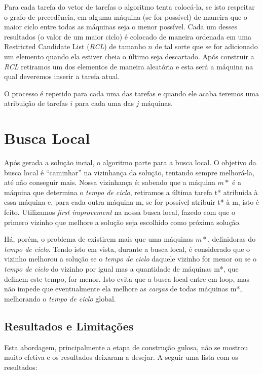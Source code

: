 \documentclass{report}
\begin{document}
Para cada tarefa do vetor de tarefas o algoritmo tenta colocá-la, se
isto respeitar o grafo de precedência, em alguma
máquina (se for possível) de maneira que o maior ciclo entre todas as máquinas
seja o menor possível. Cada um desses resultados (o valor de um maior ciclo)
é colocado de maneira ordenada em uma Restricted Candidate List (\emph{RCL})
de tamanho $n$ de tal sorte que se for adicionado um elemento quando ela estiver
cheia o último seja descartado. Após construir a \emph{RCL} retiramos um dos
elementos de maneira aleatória e esta será a máquina na qual deveremos inserir
a tarefa atual.

O processo é repetido para cada uma das tarefas e quando ele acaba teremos
uma atribuição de tarefas $i$ para cada uma das $j$ máquinas.

\section{Busca Local}

Após gerada a solução incial, o algoritmo parte para a busca local.
O objetivo da busca local é ``caminhar'' na
vizinhança da solução, tentando sempre melhorá-la, até não conseguir mais.
Nossa vizinhança é: sabendo que a máquina $m*$
é a máquina que determina o \emph{tempo de ciclo},
retiramos a última tarefa t* atribuida à essa máquina e, para cada
outra máquina m, se for possível atribuir t* à m, isto é feito.
Utilizamos \textit{first improvement} na nossa busca
local, fazedo com que o primero vizinho que melhore a solução seja
escolhido como próxima solução.

Há, porém, o problema de existirem mais que uma máquinas $m*$,
definidoras do \emph{tempo de ciclo}. Tendo isto em vista,
durante a busca local, é considerado que o vizinho melhorou a
solução se o \emph{tempo de ciclo} daquele vizinho for
menor ou se o \emph{tempo de ciclo} do vizinho por igual mas a
quantidade de máquinas m*, que definem este tempo, for
menor. Isto evita que a busca local entre em loop, mas não impede que
eventualmente ela melhore as \emph{cargas} de
todas máquinas m*, melhorando o \emph{tempo de ciclo} global.

\subsection{Resultados e Limitações}

Esta abordagem, principalmente a etapa de construção gulosa, não se mostrou muito
efetiva e os resultados deixaram a desejar. A seguir uma lista com os resultados:
\end{document}
